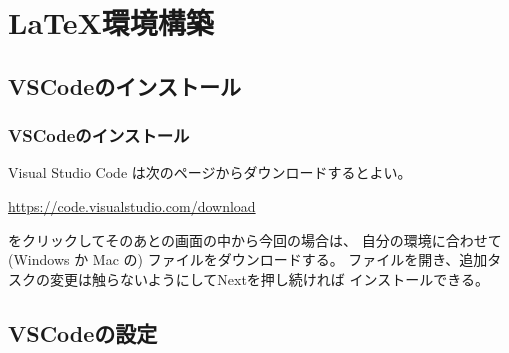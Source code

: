 \documentclass{beamer}
\begin{document}
\section{\LaTeX 環境構築}


\subsection{VSCodeのインストール}
\begin{frame}
  \frametitle{VSCodeのインストール}

  Visual Studio Code は次のページからダウンロードするとよい。

	\url{https://code.visualstudio.com/download}

  をクリックしてそのあとの画面の中から今回の場合は、
  自分の環境に合わせて (Windows か Mac の) ファイルをダウンロードする。
  ファイルを開き、追加タスクの変更は触らないようにしてNextを押し続ければ
  インストールできる。
\end{frame}

\subsection{VSCodeの設定}
\end{document}
